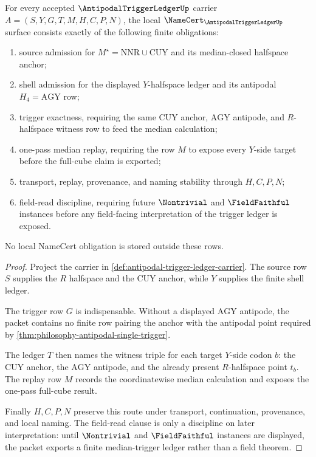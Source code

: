 
\begin{theorem}
\label{thm:antipodal-trigger-ledger-namecert-obligations}
For every accepted $\AntipodalTriggerLedgerUp$ carrier $A=(S,Y,G,T,M,H,C,P,N)$, the local $\NameCert_{\AntipodalTriggerLedgerUp}$ surface consists exactly of the following finite obligations:
\begin{enumerate}
\item source admission for $M^{\star}=\mathrm{NNR}\cup\mathrm{CUY}$ and its median-closed halfspace anchor;
\item shell admission for the displayed $Y$-halfspace ledger and its antipodal $H_{4}=\mathrm{AGY}$ row;
\item trigger exactness, requiring the same $\mathrm{CUY}$ anchor, $\mathrm{AGY}$ antipode, and $R$-halfspace witness row to feed the median calculation;
\item one-pass median replay, requiring the row $M$ to expose every $Y$-side target before the full-cube claim is exported;
\item transport, replay, provenance, and naming stability through $H,C,P,N$;
\item field-read discipline, requiring future $\Nontrivial$ and $\FieldFaithful$ instances before any field-facing interpretation of the trigger ledger is exposed.
\end{enumerate}
No local NameCert obligation is stored outside these rows.
\end{theorem}
\begin{proof}
Project the carrier in \autoref{def:antipodal-trigger-ledger-carrier}. The source row $S$ supplies the $R$ halfspace and the $\mathrm{CUY}$ anchor, while $Y$ supplies the finite shell ledger.

The trigger row $G$ is indispensable. Without a displayed $\mathrm{AGY}$ antipode, the packet contains no finite row pairing the anchor with the antipodal point required by \autoref{thm:philosophy-antipodal-single-trigger}.

The ledger $T$ then names the witness triple for each target $Y$-side codon $b$: the $\mathrm{CUY}$ anchor, the $\mathrm{AGY}$ antipode, and the already present $R$-halfspace point $t_{b}$. The replay row $M$ records the coordinatewise median calculation and exposes the one-pass full-cube result.

Finally $H,C,P,N$ preserve this route under transport, continuation, provenance, and local naming. The field-read clause is only a discipline on later interpretation: until $\Nontrivial$ and $\FieldFaithful$ instances are displayed, the packet exports a finite median-trigger ledger rather than a field theorem.
\end{proof}

